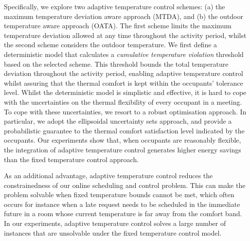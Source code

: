 Specifically, we explore two adaptive temperature control schemes: (a) the maximum temperature deviation aware approach (MTDA), and (b) the outdoor temperature aware approach (OATA). The first scheme limits the maximum temperature deviation allowed at any time throughout the activity period, whilst the second scheme considers the outdoor temperature. We first define a deterministic model that calculates a \textsl{cumulative temperature violation} threshold based on the selected scheme. This threshold bounds the total temperature deviation throughout the activity period, enabling adaptive temperature control whilst assuring that the thermal comfort is kept within the occupants' tolerance level. 
Whilst the deterministic model is simplistic and effective, it is hard to cope with the uncertainties on the thermal flexibility of every occupant in a meeting. To cope with these uncertainties, we resort to a robust optimisation approach. In particular, we adopt the ellipsoidal uncertainty sets approach, and provide a probabilistic guarantee to the thermal comfort satisfaction level indicated by the occupants. 
Our experiments show that, when occupants are reasonably flexible, the integration of adaptive temperature control generates higher energy savings than the fixed temperature control approach.

As an additional advantage, adaptive temperature control reduces the constrainedness of our online scheduling and control problem. This can make the problem solvable when fixed temperature bounds cannot be met, which often occurs for instance when a late request needs to be scheduled in the immediate future in a room whose current temperature is far away from the comfort band. In our experiments, adaptive temperature control solves a large number of instances that are unsolvable under the fixed temperature control model.


